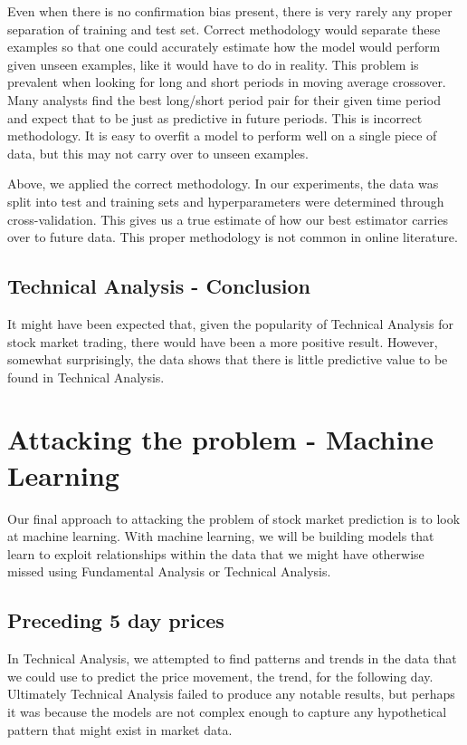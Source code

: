 \documentclass{report}
\begin{document}
Even when there is no confirmation bias present, there is very rarely any proper separation of training and test set. Correct methodology would separate these examples so that one could accurately estimate how the model would perform given unseen examples, like it would have to do in reality. This problem is prevalent when looking for long and short periods in moving average crossover. Many analysts find the best long/short period pair for their given time period and expect that to be just as predictive in future periods. This is incorrect methodology. It is easy to overfit a model to perform well on a single piece of data, but this may not carry over to unseen examples.

Above, we applied the correct methodology. In our experiments, the data was split into test and training sets and hyperparameters were determined through cross-validation. This gives us a true estimate of how our best estimator carries over to future data. This proper methodology is not common in online literature.

\section{Technical Analysis - Conclusion}

It might have been expected that, given the popularity of Technical Analysis for stock market trading, there would have been a more positive result. However, somewhat surprisingly, the data shows that there is little predictive value to be found in Technical Analysis. 

\chapter{Attacking the problem - Machine Learning}

Our final approach to attacking the problem of stock market prediction is to look at machine learning. With machine learning, we will be building models that learn to exploit relationships within the data that we might have otherwise missed using Fundamental Analysis or Technical Analysis.

\section{Preceding 5 day prices}

In Technical Analysis, we attempted to find patterns and trends in the data that we could use to predict the price movement, the trend, for the following day. Ultimately Technical Analysis failed to produce any notable results, but perhaps it was because the models are not complex enough to capture any hypothetical pattern that might exist in market data.
\end{document}
